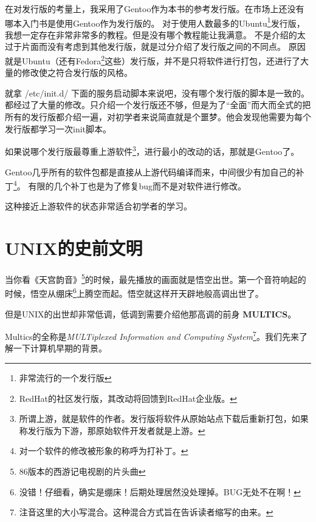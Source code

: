 在对发行版的考量上，我采用了Gentoo作为本书的参考发行版。在市场上还没有哪本入门书是使用Gentoo作为发行版的。
对于使用人数最多的Ubuntu\footnote{非常流行的一个发行版}发行版，我想一定存在非常非常多的教程。但是没有哪个教程能让我满意。
不是介绍的太过于片面而没有考虑到其他发行版，就是过分介绍了发行版之间的不同点。
原因就是Ubuntu（还有Fedora\footnote{RedHat的社区发行版，其改动将回馈到RedHat企业版。}这些）发行版，并不是只将软件进行打包，还进行了大量的修改使之符合发行版的风格。

\begin{notice}
就拿 /etc/init.d/ 下面的服务启动脚本来说吧，没有哪个发行版的脚本是一致的。
都经过了大量的修改。只介绍一个发行版还不够，但是为了“全面”而大而全式的把所有的发行版都介绍一遍，对初学者来说简直就是个噩梦。他会发现他需要为每个发行版都学习一次init脚本。
\end{notice}

如果说哪个发行版最尊重上游软件\footnote{所谓上游，就是软件的作者。发行版将软件从原始站点下载后重新打包，如果称发行版为下游，那原始软件开发者就是上游。}，进行最小的改动的话，那就是Gentoo了。

Gentoo几乎所有的软件包都是直接从上游代码编译而来，中间很少有加自己的补丁\footnote{对一个软件的修改被形象的称呼为打补丁。}。
有限的几个补丁也是为了修复bug而不是对软件进行修改。

这种接近上游软件的状态非常适合初学者的学习。

\section{UNIX的史前文明}

当你看《天宫韵音》\footnote{86版本的西游记电视剧的片头曲}的时候，最先播放的画面就是悟空出世。第一个音符响起的时候，悟空从绷床\footnote{没错！仔细看，确实是绷床！后期处理居然没处理掉。BUG无处不在啊！}上腾空而起。悟空就这样开天辟地般高调出世了。

但是UNIX的出世却非常低调，低调到需要介绍他那高调的前身{} \mbox{\textbf{MULTICS}}。

Multics的全称是\textit{MULTiplexed Information and Computing System}\footnote{注音这里的大小写混合。这种混合方式旨在告诉读者缩写的由来。}。我们先来了解一下计算机早期的背景。




